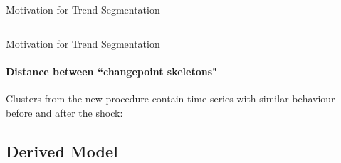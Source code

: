 \documentclass{beamer}
\begin{document}
\begin{frame}{Motivation for Trend Segmentation}
\begin{columns}
\end{columns}
    
\end{frame}




\begin{frame}{Motivation for Trend Segmentation}
\framesubtitle{Distance between ``changepoint skeletons"}

Clusters from the new procedure contain time series with similar behaviour before and after the shock:

\bigskip

\begin{figure}
    \centering
    \begin{subfigure}
        \texttt{[image: ../plots/SnP500\_frechet\_similar\_1.png]}
    \end{subfigure}
    \begin{subfigure}
        \texttt{[image: ../plots/SnP500\_frechet\_similar\_2.png]}    
    \end{subfigure}
    \begin{subfigure}
        \texttt{[image: ../plots/SnP500\_frechet\_similar\_3.png]}
    \end{subfigure}
\end{figure}
    
\end{frame}



\subsection{Derived Model}



\end{document}

